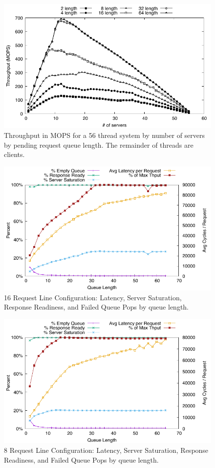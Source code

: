 \documentclass{uicthesi}
\begin{document}
\begin{figure}[ht!]
\centering
\includegraphics[width=0.9\columnwidth]{FIG/vary_queue_length.pdf}
\caption{Throughput in MOPS for a 56 thread system by number of servers by pending request queue length. The remainder of threads are clients.}
\label{fig:dedicated_vary_queue}
\end{figure}

\begin{figure}[ht!]
\centering
\includegraphics[width=0.9\columnwidth]{FIG/16rldedicated_saturation.pdf}
\caption{16 Request Line Configuration: Latency, Server Saturation, Response Readiness, and Failed Queue Pops by queue length.}
\label{fig:saturation16RL}
\end{figure}

\begin{figure}[ht!]
\centering
\includegraphics[width=0.9\columnwidth]{FIG/8rldedicated_saturation.pdf}
\caption{8 Request Line Configuration: Latency, Server Saturation, Response Readiness, and Failed Queue Pops by queue length.}
\label{fig:saturation8RL}
\end{figure}
\end{document}
